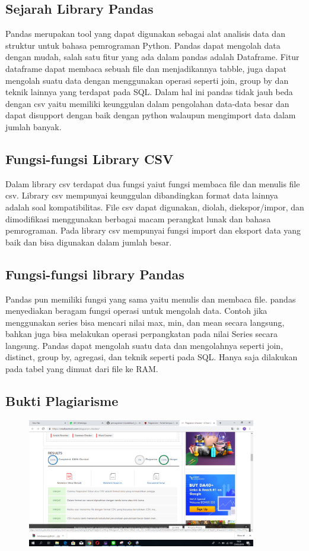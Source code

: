 \subsection{Sejarah Library Pandas}
Pandas merupakan tool yang dapat digunakan sebagai alat analisis data dan struktur untuk bahasa pemrograman Python. Pandas dapat mengolah data dengan mudah, salah satu fitur yang ada dalam pandas adalah Dataframe. Fitur dataframe dapat membaca sebuah file dan menjadikannya tabble, juga dapat mengolah suatu data dengan menggunakan operasi seperti join, group by dan teknik lainnya yang terdapat pada SQL. Dalam hal ini pandas tidak jauh beda dengan csv yaitu memiliki keunggulan dalam pengolahan data-data besar dan dapat disupport dengan baik dengan python walaupun mengimport data dalam jumlah banyak.
\subsection{Fungsi-fungsi Library CSV}
Dalam library csv terdapat dua fungsi yaiut fungsi membaca file dan menulis file csv.
Library csv mempunyai keunggulan dibandingkan format data lainnya adalah soal kompatibilitas. File csv dapat digunakan, diolah, diekspor/impor, dan dimodifikasi menggunakan berbagai macam perangkat lunak dan bahasa pemrograman. Pada library csv mempunyai fungsi import dan eksport data yang baik dan bisa digunakan dalam jumlah besar.
\subsection{Fungsi-fungsi library Pandas}
Pandas pun memiliki fungsi yang sama yaitu menulis dan membaca file. pandas menyediakan beragam fungsi operasi untuk mengolah data. Contoh jika menggunakan series bisa mencari nilai max, min, dan mean secara langsung, bahkan juga bisa melakukan operasi perpangkatan pada nilai Series secara langsung.
Pandas dapat mengolah suatu data dan mengolahnya seperti join, distinct, group by, agregasi, dan teknik seperti pada SQL. Hanya saja dilakukan pada tabel yang dimuat dari file ke RAM.
\subsection{Bukti Plagiarisme}
\begin{figure}[h]
	\includegraphics[width=10cm]{figures/dzihan/bukti.png}
	\centering
\end{figure}

